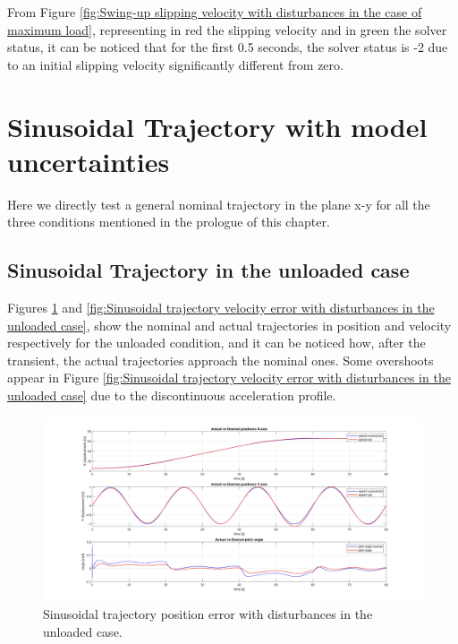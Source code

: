 From Figure \ref{fig:Swing-up slipping velocity with disturbances in the case of maximum load}, representing in red the slipping velocity and in green the solver status, it can be noticed that for the first 0.5 seconds, the solver status is -2 due to an initial slipping velocity significantly different from zero. 

\section{Sinusoidal Trajectory with model uncertainties}
\label{sec:Sinusoidal Trajectory with model uncertainties}

Here we directly test a general nominal trajectory in the plane x-y for all the three conditions mentioned in the prologue of this chapter.

\subsection{Sinusoidal Trajectory in the unloaded case}
\label{subsec:Sinusoidal Trajectory in the unloaded case}

Figures \ref{fig:Sinusoidal trajectory position error with disturbances in the unloaded case} and \ref{fig:Sinusoidal trajectory velocity error with disturbances in the unloaded case}, show the nominal and actual trajectories in position and velocity respectively for the unloaded condition, and it can be noticed how, after the transient, the actual trajectories approach the nominal ones.
Some overshoots appear in Figure \ref{fig:Sinusoidal trajectory velocity error with disturbances in the unloaded case} due to the discontinuous acceleration profile.


\begin{figure}
    \centering
    \includegraphics[width=1\linewidth]{Images/Robustness analysis/Unloaded/sinusoidal trajectory/Position_error.jpg}
    \caption{Sinusoidal trajectory position error with disturbances in the unloaded case.}
    \label{fig:Sinusoidal trajectory position error with disturbances in the unloaded case}
\end{figure}

